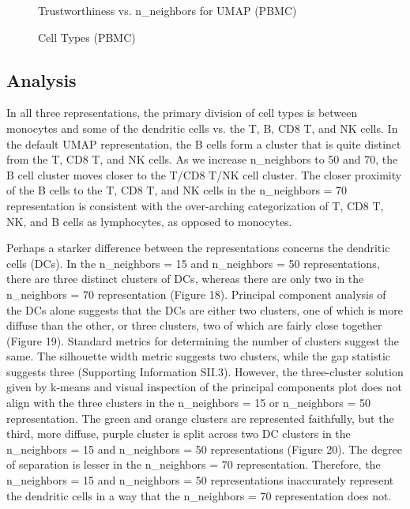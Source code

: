 \documentclass{article}
\begin{document}
\renewcommand{\thefigure}{16}
\begin{figure}[H]
\centering
\caption{Trustworthiness vs. n\_neighbors for UMAP (PBMC)}
\end{figure}

\renewcommand{\thefigure}{17}
\begin{figure}[H]
\centering
\caption{Cell Types (PBMC)}
\end{figure}

\subsection{Analysis}
In all three representations, the primary division of cell types is between monocytes and some of the dendritic cells vs. the T, B, CD8 T, and NK cells. In the default UMAP representation, the B cells form a cluster that is quite distinct from the T, CD8 T, and NK cells. As we increase n\_neighbors to 50 and 70, the B cell cluster moves closer to the T/CD8 T/NK cell cluster. The closer proximity of the B cells to the T, CD8 T, and NK cells in the n\_neighbors = 70 representation is consistent with the over-arching categorization of T, CD8 T, NK, and B cells as lymphocytes, as opposed to monocytes.

Perhaps a starker difference between the representations concerns the dendritic cells (DCs). In the n\_neighbors = 15 and n\_neighbors = 50 representations, there are three distinct clusters of DCs, whereas there are only two in the n\_neighbors = 70 representation (Figure 18). Principal component analysis of the DCs alone suggests that the DCs are either two clusters, one of which is more diffuse than the other, or three clusters, two of which are fairly close together (Figure 19). Standard metrics for determining the number of clusters suggest the same. The silhouette width metric suggests two clusters, while the gap statistic suggests three (Supporting Information SII.3). However, the three-cluster solution given by k-means and visual inspection of the principal components plot does not align with the three clusters in the n\_neighbors = 15 or n\_neighbors = 50 representation. The green and orange clusters are represented faithfully, but the third, more diffuse, purple cluster is split across two DC clusters in the n\_neighbors = 15 and n\_neighbors = 50 representations (Figure 20). The degree of separation is lesser in the n\_neighbors = 70 representation. Therefore, the n\_neighbors = 15 and n\_neighbors = 50 representations inaccurately represent the dendritic cells in a way that the n\_neighbors = 70 representation does not.
\end{document}
